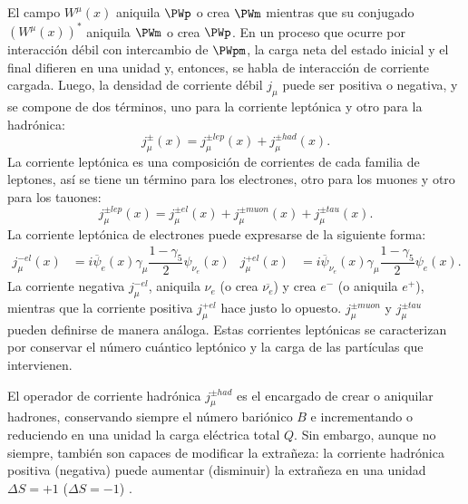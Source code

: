 El campo $W^{\mu}(x)$ aniquila $\PWp$ o crea $\PWm$ mientras que su conjugado $\left(W^{\mu}(x)\right)^\ast$ aniquila $\PWm$ o crea $\PWp$. En un proceso que ocurre por interacción débil con intercambio de $\PWpm$, la carga neta del estado inicial y el final difieren en una unidad y, entonces, se habla de interacción de corriente cargada. Luego, la densidad de corriente débil $j_{\mu}$ puede ser positiva o negativa, y se compone de dos términos, uno para la corriente leptónica y otro para la hadrónica:
\begin{equation}
j_{\mu} ^{\pm }\left( x\right) =j_{\mu} ^{\pm lep}\left( x\right) +j_{\mu} ^{\pm had}\left( x\right) . \label{eq:weak_current_hadylep}
\end{equation}
La corriente leptónica es una composición de corrientes de cada familia de leptones, así se tiene un término para los electrones, otro para los muones y otro para los tauones:
\begin{equation}
j_{\mu }^{\pm lep}\left( x\right) =j_{\mu }^{\pm el}\left( x\right) +j_{\mu }^{\pm muon}\left( x\right) +j_{\mu} ^{\pm tau}\left( x\right) . \label{eq:leptonic_weak_current}
\end{equation}
La corriente leptónica de electrones puede expresarse de la siguiente forma:
\begin{align}
j_{\mu }^{-el}\left(x\right)&=i\overline{\psi}_{e}\left( x\right) \gamma _{\mu }\dfrac{1-\gamma_{5}}{2}\psi_{{ \nu}_{e}}\left( x\right) & j_{\mu}^{+el}\left(x\right)&= i\overline{\psi}_{{\nu}_{e}}\left(x\right)\gamma _{\mu}\dfrac{1-\gamma_{5}}{2}\psi_{e}\left( x\right) . \label{eq:electric_weak_current}
\end{align}
La corriente negativa $j_{\mu }^{-el}$, aniquila $\nu_e$ (o crea $\overline{\nu_e}$) y crea $e^-$ (o aniquila $e^+$), mientras que la corriente positiva $j_{\mu }^{+el}$ hace justo lo opuesto. $j_{\mu }^{\pm muon}$ y $j_{\mu }^{\pm tau}$ pueden definirse de manera análoga. Estas corrientes leptónicas se caracterizan por conservar el número cuántico leptónico y la carga de las partículas que intervienen. 

El operador de corriente hadrónica $j_{\mu} ^{\pm had}$ es el encargado de crear o aniquilar hadrones, conservando siempre el número bariónico $B$ e incrementando o reduciendo en una unidad la carga eléctrica total $Q$. Sin embargo, aunque no siempre, también son capaces de modificar la extrañeza: la corriente hadrónica positiva (negativa) puede aumentar (disminuir) la extrañeza en una unidad $\Delta S = +1$ ($\Delta S = -1$) \cite{notas2020}.


